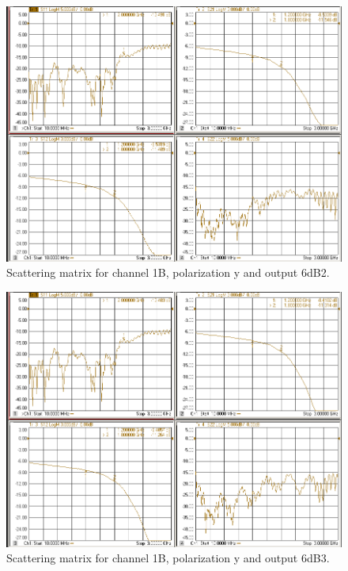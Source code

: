 \documentclass[12pt,a4paper,oneside]{article}
\begin{document}
\begin{figure}[H]
\centering
\includegraphics[width=0.9\linewidth]{VNA_results/1By_6dB2.png}
\caption{Scattering matrix for channel 1B, polarization y and output 6dB2.}
\label{fig:1By_6dB2}
\end{figure}


\begin{figure}[H]
\centering
\includegraphics[width=0.9\linewidth]{VNA_results/1By_6dB3.png}
\caption{Scattering matrix for channel 1B, polarization y and output 6dB3.}
\label{fig:1By_6dB3}
\end{figure}
\end{document}
